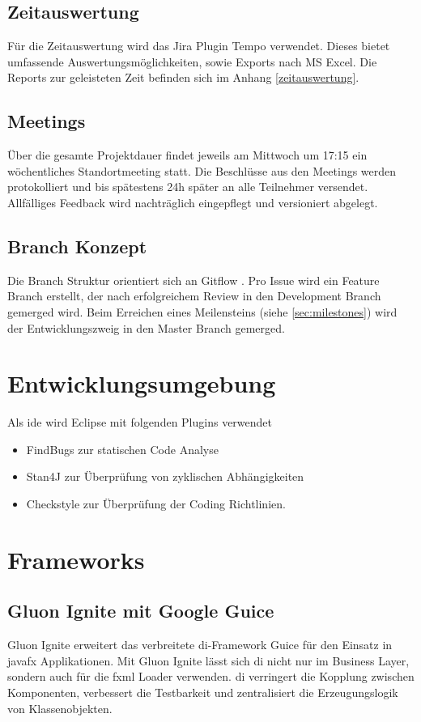 \documentclass[11pt,a4paper,english,oneside]{book}
\numberwithin{equation}{chapter}
\begin{document}
	\subsection{Zeitauswertung}
	Für die Zeitauswertung wird das Jira Plugin Tempo \cite{jiratempo} verwendet. Dieses bietet umfassende Auswertungsmöglichkeiten, sowie Exports nach MS Excel. Die Reports zur geleisteten Zeit befinden sich im Anhang \ref{zeitauswertung}.
	
	\subsection{Meetings} \label{ssec:meeting}
	Über die gesamte Projektdauer findet jeweils am Mittwoch um 17:15 ein wöchentliches Standortmeeting statt. Die Beschlüsse aus den Meetings werden protokolliert und bis spätestens 24h später an alle Teilnehmer versendet. Allfälliges Feedback wird nachträglich eingepflegt und versioniert abgelegt.
	
	\subsection{Branch Konzept}
	Die Branch Struktur orientiert sich an Gitflow \cite{gitflow}. Pro Issue wird ein Feature Branch erstellt, der nach erfolgreichem Review in den Development Branch gemerged wird. Beim Erreichen eines Meilensteins (siehe \ref{sec:milestones}) wird der Entwicklungszweig in den Master Branch gemerged.
	
	\section{Entwicklungsumgebung}
	Als \gls{ide} wird Eclipse mit folgenden Plugins verwendet
	\begin{itemize}
		\item FindBugs \cite{findbugs} zur statischen Code Analyse
		\item Stan4J \cite{stan4j} zur Überprüfung von zyklischen Abhängigkeiten
		\item Checkstyle \cite{checkstyle} zur Überprüfung der Coding Richtlinien.
	\end{itemize}
	
	\section{Frameworks}
	
	\subsection{Gluon Ignite mit Google Guice} \label{DI}
	Gluon Ignite \cite{gluonignite} erweitert das verbreitete \gls{di}-Framework Guice \cite{guice} für den Einsatz in \gls{javafx} Applikationen. Mit Gluon Ignite lässt sich \gls{di} nicht nur im Business Layer, sondern auch für die \gls{fxml} Loader verwenden. \gls{di} verringert die Kopplung zwischen Komponenten, verbessert die Testbarkeit und zentralisiert die Erzeugungslogik von Klassenobjekten.
	
\end{document}

